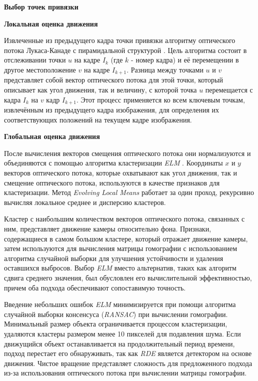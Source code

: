 \textbf{Выбор точек привязки}

\textbf{Локальная оценка движения}

Извлеченные из предыдущего кадра точки привязки алгоритму оптического потока Лукаса-Канаде с пирамидальной структурой \cite{Bouguet1999PyramidalIO}. Цель алгоритма состоит в отслеживании точки \( u \) на кадре \( I_k \) (где \( k \) - номер кадра) и её перемещении в другое местоположение \( v \) на кадре \( I_{k+1} \). Разница между точками \( u \) и \( v \) представляет собой вектор оптического потока для этой точки, который описывает как угол движения, так и величину, с которой точка \( u \) перемещается с кадра \( I_k \) на \( v \) кадр \( I_{k+1} \). Этот процесс применяется ко всем ключевым точкам, извлечённым из предыдущего кадра изображения, для определения их соответствующих положений на текущем кадре изображения.

\textbf{Глобальная оценка движения}

После вычисления векторов смещения оптического потока они нормализуются и объединяются с помощью алгоритма кластеризации \textit{ELM} \cite{ELM}. Координаты \( x \) и \( y \) векторов оптического потока, которые охватывают как угол движения, так и смещение оптического потока, используются в качестве признаков для кластеризации. Метод \textit{Evolving Local Means} работает за один проход, рекурсивно вычисляя локальное среднее и дисперсию кластеров.

Кластер с наибольшим количеством векторов оптического потока, связанных с ним, представляет движение камеры относительно фона. Признаки, содержащиеся в самом большом кластере, который отражает движение камеры, затем используются для вычисления матрицы гомографии с использованием алгоритма случайной выборки для улучшения устойчивости и удаления оставшихся выбросов. Выбор \textit{ELM} вместо альтернатив, таких как алгоритм сдвига среднего значения, был обусловлен его вычислительной эффективностью, причем оба подхода обеспечивают сопоставимую точность. 

Введение небольших ошибок \textit{ELM} минимизируется при помощи алгоритма случайной выборки консенсуса (\textit{RANSAC}) при вычислении гомографии. Минимальный размер объекта ограничивается процессом кластеризации, удаляются кластеры размером менее 10 пикселей для подавления шума. Если движущийся объект останавливается на продолжительный период времени, подход перестает его обнаруживать, так как \textit{RDE} является детектором на основе движения. Чистое вращение представляет сложность для предложенного подхода из-за использования оптического потока при вычислении матрицы гомографии.

